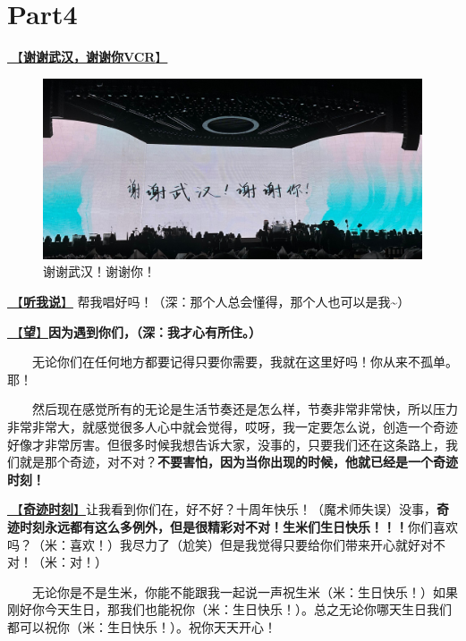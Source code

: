 \documentclass[]{ctexbook}
\begin{document}
\section{Part4}\label{wuhan-20240727-part4}

\hyperref[thank-you-vcr]{🎥【\textbf{谢谢武汉，谢谢你VCR}】}

\begin{figure}

{\centering \includegraphics[width=400pt]{img/wuhan20240727/thank-wuhan} 

}

\caption{谢谢武汉！谢谢你！}\label{fig:unnamed-chunk-65}
\end{figure}

\hyperref[listen-to-me]{🎵【\textbf{听我说}】} 帮我唱好吗！（深：那个人总会懂得，那个人也可以是我\textasciitilde）

\hyperref[hope]{🎵【\textbf{望}】}\textbf{因为遇到你们，（深：我才心有所住。）}

  无论你们在任何地方都要记得只要你需要，我就在这里好吗！你从来不孤单。耶！

  然后现在感觉所有的无论是生活节奏还是怎么样，节奏非常非常快，所以压力非常非常大，就感觉很多人心中就会觉得，哎呀，我一定要怎么说，创造一个奇迹好像才非常厉害。但很多时候我想告诉大家，没事的，只要我们还在这条路上，我们就是那个奇迹，对不对？\textbf{不要害怕，因为当你出现的时候，他就已经是一个奇迹时刻！}

\hyperref[magic-moment]{🎵【\textbf{奇迹时刻}】}让我看到你们在，好不好？十周年快乐！（魔术师失误）没事，\textbf{奇迹时刻永远都有这么多例外，但是很精彩对不对！生米们生日快乐！！！}你们喜欢吗？（米：喜欢！）我尽力了（尬笑）但是我觉得只要给你们带来开心就好对不对！（米：对！）

  无论你是不是生米，你能不能跟我一起说一声祝生米（米：生日快乐！）如果刚好你今天生日，那我们也能祝你（米：生日快乐！）。总之无论你哪天生日我们都可以祝你（米：生日快乐！）。祝你天天开心！
\end{document}
